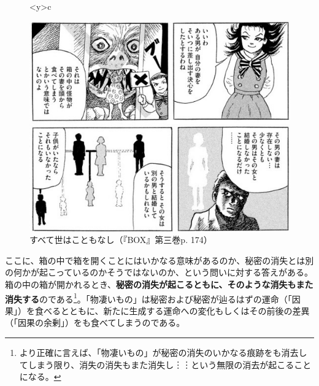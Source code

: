 \documentclass[9pt,b5j,twoside,twocolumn]{utarticle}
\begin{document}
\begin{figure}[h]
\begin{tabular}<y>{c}
\begin{minipage}[c]{0.67\hsize}
	\centering
	\includegraphics[clip, scale=0.45]{因果}
	\caption{すべて世はこともなし（『BOX』第三巻p. 174）}
	\end{minipage}
\end{tabular}
\end{figure}

ここに、箱の中で箱を開くことにはいかなる意味があるのか、秘密の消失とは別の何かが起こっているのかそうではないのか、という問いに対する答えがある。箱の中の箱が開かれるとき、\textbf{秘密の消失が起こるともに、そのような消失もまた消失する}のである\footnote{より正確に言えば、「物凄いもの」が秘密の消失のいかなる痕跡をも消去してしまう限り、消失の消失もまた消失し︙︙という無限の消去が起こることになる。}。「物凄いもの」は秘密および秘密が辿るはずの運命（「因果」）を食べるとともに、新たに生成する運命への変化もしくはその前後の差異（「因果の余剰」）をも食べてしまうのである。
\end{document}
